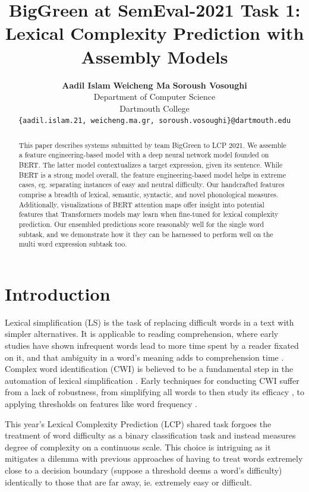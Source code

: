 \documentclass[11pt,a4paper]{article}
\title{BigGreen at SemEval-2021 Task 1: \\
Lexical Complexity Prediction with Assembly Models}
\author{
  \textbf{Aadil Islam}\normalfont{,} \textbf{Weicheng Ma}\normalfont{, and} \textbf{Soroush Vosoughi}\\
  Department of Computer Science\\
  Dartmouth College\\
  \texttt{\{aadil.islam.21, weicheng.ma.gr, soroush.vosoughi\}@dartmouth.edu}
}
\date{}
\begin{document}
\maketitle

\begin{abstract}
  This paper describes systems submitted by team BigGreen to LCP 2021. We assemble a feature engineering-based model with a deep neural network model founded on BERT. The latter model contextualizes a target expression, given its sentence. While BERT is a strong model overall, the feature engineering-based model helps in extreme cases, eg. separating instances of easy and neutral difficulty. Our handcrafted features comprise a breadth of lexical, semantic, syntactic, and novel phonological measures. Additionally, visualizations of BERT attention maps offer insight into potential features that Transformers models may learn when fine-tuned for lexical complexity prediction. Our ensembled predictions score reasonably well for the single word subtask, and we demonstrate how it they can be harnessed to perform well on the multi word expression subtask too.
\end{abstract}

\section{Introduction}

Lexical simplification (LS) is the task of replacing difficult words in a text with simpler alternatives. It is applicable to reading comprehension, where early studies have shown infrequent words lead to more time spent by a reader fixated on it, and that ambiguity in a word's meaning adds to comprehension time \citep{raynerd86}. Complex word identification (CWI) is believed to be a fundamental step in the automation of lexical simplification \citep{shardlow2014open}. Early techniques for conducting CWI suffer from a lack of robustness, from simplifying all words to then study its efficacy \citep{devlintait}, to applying thresholds on features like word frequency \citep{10.1007/11573067_19}. 

This year's Lexical Complexity Prediction (LCP) shared task \citep{shardlow2020complex} forgoes the treatment of word difficulty as a binary classification task \citep{paetzoldspecia:2016:SemEval1, stajner-EtAl:2018:BEA} and instead measures degree of complexity on a continuous scale. This choice is intriguing as it mitigates a dilemma with previous approaches of having to treat words extremely close to a decision boundary (suppose a threshold deems a word's difficulty) identically to those that are far away, ie. extremely easy or difficult.
\end{document}
